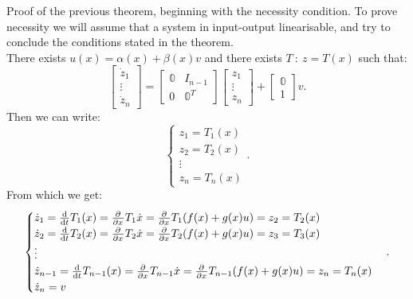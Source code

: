 \begin{myproof}
    Proof of the previous theorem, beginning with the necessity condition.
    To prove necessity we will assume that a system in input-output linearisable, and try to conclude the conditions stated in the theorem.\\
    There exists $u(x) = \alpha(x)+\beta(x)v$ and there exists  $T\: : \: z = T(x)$ such that:
    \[
    \begin{bmatrix}
        \dot{z}_1 \\
        \vdots\\
        \dot{z}_n
    \end{bmatrix} = \begin{bmatrix}
    \mathbb{0} & I_{n-1} \\
    0 & \mathbb{0}^{T}
    \end{bmatrix}\begin{bmatrix}
        z_1  \\
        \vdots\\
        z_n
    \end{bmatrix}
    + \begin{bmatrix}
        \mathbb{0}  \\
        1
    \end{bmatrix} v
    .\] 
    Then we can write:
    \[
    \begin{cases}
        z_1 = T_1(x)\\
        z_2 = T_2(x)\\
        \vdots \\
        z_n = T_n(x)
    \end{cases}
    .\] 
    From which we get:
    \[
        \begin{cases}
        \dot{z}_1 = \odv{}{t}T_1(x) = \pdv{}{x}T_1\dot{x} = \pdv{}{x}T_1(f(x)+g(x)u) = z_2=T_2(x)  \\
        \dot{z}_2 = \odv{}{t}T_2(x) = \pdv{}{x}T_2\dot{x} = \pdv{}{x}T_2(f(x)+g(x)u) = z_3=T_3(x) \\
        \vdots \\
        \dot{z}_{n-1} = \odv{}{t}T_{n-1}(x) = \pdv{}{x}T_{n-1}\dot{x} = \pdv{}{x}T_{n-1}(f(x)+g(x)u) = z_{n}=T_{n}(x) \\
        \dot{z}_n = v
        
            
        \end{cases}
    .\] 
\end{myproof}
